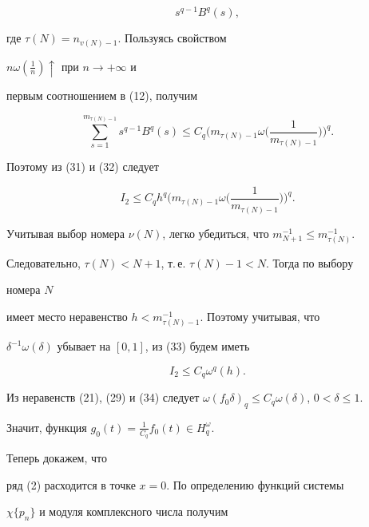 \begin{pf}
\begin{equation}
s^{q-1}B^q(s),


\end{equation} 


где $\tau(N)=n_{v(N)-1}$. Пользуясь свойством 


$n\omega(\frac{1}{n})\uparrow$ при $n\to+\infty$ и 


первым соотношением в (12), получим 


$$ 


\sum^{m_{\tau(N)-1}}_{s=1}s^{q-1}B^q(s)\le C_q 


\bigg(m_{\tau(N)-1}\omega\bigg(\frac{1}{m_{\tau(N)-1}} 


\bigg)\bigg)^q.


$$ 


Поэтому из (31) и (32) следует


\begin{equation} 


I_2\le C_q h^q\bigg(m_{\tau(N)-1}\omega\bigg( 


\frac{1}{m_{\tau(N)-1}}\bigg)\bigg)^q. 


\end{equation} 


Учитывая выбор номера $\nu(N)$, легко убедиться, что $m^{-1}_{N+1}\le 


m^{-1}_{\tau(N)}$. 


Следовательно, $\tau(N)<N+1$, т.\,е. $\tau(N)-1<N$. Тогда по выбору 


номера $N$ 


имеет место неравенство $h<m^{-1}_{\tau(N)-1}$. Поэтому учитывая, что 


$\delta^{-1}\omega(\delta)$ убывает на $[0,1]$, из (33) будем иметь 


\begin{equation} 


I_2\le C_q \omega^q(h). 


\end{equation} 


Из неравенств (21), (29) и (34) следует $\omega(f_0\delta)_q\le 


C_q\omega(\delta)$, $0<\delta\le1$. 


Значит, функция $g_0(t)=\frac{1}{C_q}f_0(t)\in H^\omega_q$. 


Теперь докажем, что 


ряд (2) расходится в точке $x=0$. По определению функций системы 


$\chi\{p_n\}$ и модуля комплексного числа получим 


\begin{equation} 



\end{equation}
\end{pf}
